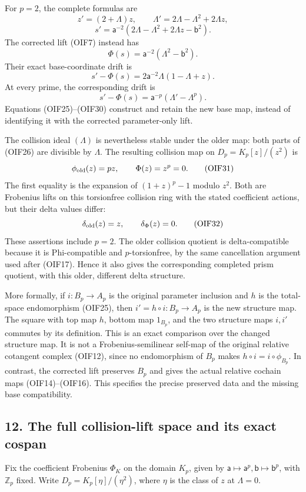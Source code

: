 \documentclass[
]{article}
\begin{document}
For \(p=2\), the complete formulas are \[
z'=(2+\Lambda)z,\qquad
\Lambda'=2\Lambda-\Lambda^2+2\Lambda z,
\] \[
s'=\mathsf a^{-2}
(2\Lambda-\Lambda^2+2\Lambda z-\mathsf b^2).
\tag{OIF28}
\] The corrected lift (OIF7) instead has \[
\Phi(s)=\mathsf a^{-2}(\Lambda^2-\mathsf b^2).
\] Their exact base-coordinate drift is \[
s'-\Phi(s)
=2\mathsf a^{-2}\Lambda(1-\Lambda+z).
\tag{OIF29}
\] At every prime, the corresponding drift is \[
s'-\Phi(s)=\mathsf a^{-p}(\Lambda'-\Lambda^p).
\tag{OIF30}
\] Equations (OIF25)--(OIF30) construct and retain the new base map,
instead of identifying it with the corrected parameter-only lift.

The collision ideal \((\Lambda)\) is nevertheless stable under the older
map: both parts of (OIF26) are divisible by \(\Lambda\). The resulting
collision map on \(D_p=K_p[z]/(z^2)\) is \[
\phi_{\rm old}(z)=pz,\qquad
\Phi(z)=z^p=0.
\tag{OIF31}
\] The first equality is the expansion of \((1+z)^p-1\) modulo \(z^2\).
Both are Frobenius lifts on this torsionfree collision ring with the
stated coefficient actions, but their delta values differ: \[
\delta_{\rm old}(z)=z,\qquad \delta_{\Phi}(z)=0.
\tag{OIF32}
\] These assertions include \(p=2\). The older collision quotient is
delta-compatible because it is Phi-compatible and \(p\)-torsionfree, by
the same cancellation argument used after (OIF17). Hence it also gives
the corresponding completed prism quotient, with this older, different
delta structure.

More formally, if \(i:B_p\to A_p\) is the original parameter inclusion
and \(h\) is the total-space endomorphism (OIF25), then
\(i'=h\circ i:B_p\to A_p\) is the new structure map. The square with top
map \(h\), bottom map \(1_{B_p}\), and the two structure maps \(i,i'\)
commutes by its definition. This is an exact comparison over the changed
structure map. It is not a Frobenius-semilinear self-map of the original
relative cotangent complex (OIF12), since no endomorphism of \(B_p\)
makes \(h\circ i=i\circ\phi_{B_p}\). In contrast, the corrected lift
preserves \(B_p\) and gives the actual relative cochain maps
(OIF14)--(OIF16). This specifies the precise preserved data and the
missing base compatibility.

\subsection{12. The full collision-lift space and its exact
cospan}\label{the-full-collision-lift-space-and-its-exact-cospan}

Fix the coefficient Frobenius \(\Phi_K\) on the domain \(K_p\), given by
\(\mathsf a\mapsto\mathsf a^p,\mathsf b\mapsto\mathsf b^p\), with
\(\mathbb Z_p\) fixed. Write \(D_p=K_p[\eta]/(\eta^2)\), where \(\eta\)
is the class of \(z\) at \(\Lambda=0\).
\end{document}
